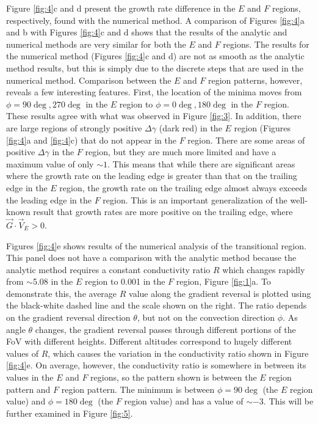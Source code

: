 Figure \ref{fig:4}c and d present the growth rate difference in the \(E\) and \(F\) regions, respectively, found with the numerical method.  A comparison of Figures \ref{fig:4}a and b with Figures \ref{fig:4}c and d shows that the results of the analytic and numerical methods are very similar for both the \(E\) and \(F\) regions. The results for the numerical method (Figures \ref{fig:4}c and d) are not as smooth as the analytic method results, but this is simply due to the discrete steps that are used in the numerical method. Comparison between the \(E\) and \(F\) region patterns, however, reveals a few interesting features. First, the location of the minima moves from \(\phi=90\deg,270\deg\) in the \(E\) region to \(\phi=0\deg,180\deg\) in the \(F\) region.  These results agree with what was observed in Figure \ref{fig:3}.  In addition, there are large regions of strongly positive \(\Delta\gamma\) (dark red) in the \(E\) region (Figures \ref{fig:4}a and \ref{fig:4}c) that do not appear in the \(F\) region.  There are some areas of positive \(\Delta\gamma\) in the \(F\) region, but they are much more limited and have a maximum value of only \(\sim 1\).  This means that while there are significant areas where the growth rate on the leading edge is greater than that on the trailing edge in the \(E\) region, the growth rate on the trailing edge almost always exceeds the leading edge in the \(F\) region. This is an important generalization of the well-known result that growth rates are more positive on the trailing edge, where \(\vec{G}\cdot \vec{V}_E>0\).



Figures \ref{fig:4}e shows results of the numerical analysis of the transitional region. This panel does not have a comparison with the analytic method because the analytic method requires a constant conductivity ratio \(R\) which changes rapidly from \(\sim\)5.08 in the \(E\) region to 0.001 in the \(F\) region, Figure \ref{fig:1}a. To demonstrate this, the average \(R\) value along the gradient reversal is plotted using the black-white dashed line and the scale shown on the right. The ratio depends on the gradient reversal direction \(\theta\), but not on the convection direction \(\phi\).  As angle \(\theta\) changes, the gradient reversal passes through different portions of the FoV with different heights. Different altitudes correspond to hugely different values of \(R\), which causes the variation in the conductivity ratio shown in Figure \ref{fig:4}e. On average, however, the conductivity ratio is somewhere in between its values in the \(E\) and \(F\) regions, so the pattern shown is between the \(E\) region pattern and \(F\) region pattern. The minimum is between \(\phi=90\deg\) (the \(E\) region value) and \(\phi=180\deg\) (the \(F\) region value) and has a value of \(\sim -3\). This will be further examined in Figure \ref{fig:5}.



